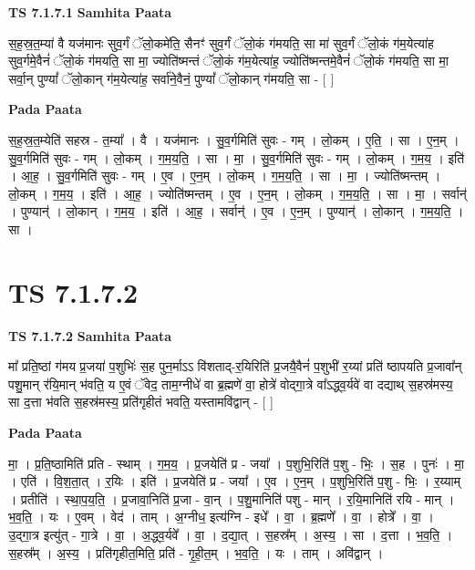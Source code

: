 \documentclass[17pt]{extarticle}
\begin{document}
\textbf{TS 7.1.7.1 } \newline
\textbf{Samhita Paata} \newline

स॒ह॒स्र॒त॒म्या॑ वै यज॑मानः सुव॒र्गं ॅलो॒कमे॑ति॒ सैनꣳ॑ सुव॒र्गं ॅलो॒कं ग॑मयति॒ सा मा॑ सुव॒र्गं ॅलो॒कं ग॑म॒येत्या॑ह सुव॒र्गमे॒वैनं॑ ॅलो॒कं ग॑मयति॒ सा मा॒ ज्योति॑ष्मन्तं ॅलो॒कं ग॑म॒येत्या॑ह॒ ज्योति॑ष्मन्तमे॒वैनं॑ ॅलो॒कं ग॑मयति॒ सा मा॒ सर्वा॒न् पुण्यां᳚ ॅलो॒कान् ग॑म॒येत्या॑ह॒ सर्वा॑ने॒वैनं॒ पुण्यां᳚ ॅलो॒कान् ग॑मयति॒ सा - [  ] \newline

\textbf{Pada Paata} \newline

स॒ह॒स्र॒त॒म्येति॑ सहस्र - त॒म्या᳚ । वै । यज॑मानः । सु॒व॒र्गमिति॑ सुवः - गम् । लो॒कम् । ए॒ति॒ । सा । ए॒न॒म् । सु॒व॒र्गमिति॑ सुवः - गम् । लो॒कम् । ग॒म॒य॒ति॒ । सा । मा॒ । सु॒व॒र्गमिति॑ सुवः - गम् । लो॒कम् । ग॒म॒य॒ । इति॑ । आ॒ह॒ । सु॒व॒र्गमिति॑ सुवः - गम् । ए॒व । ए॒न॒म् । लो॒कम् । ग॒म॒य॒ति॒ । सा । मा॒ । ज्योति॑ष्मन्तम् । लो॒कम् । ग॒म॒य॒ । इति॑ । आ॒ह॒ । ज्योति॑ष्मन्तम् । ए॒व । ए॒न॒म् । लो॒कम् । ग॒म॒य॒ति॒ । सा । मा॒ । सर्वान्॑ । पुण्यान्॑ । लो॒कान् । ग॒म॒य॒ । इति॑ । आ॒ह॒ । सर्वान्॑ । ए॒व । ए॒न॒म् । पुण्यान्॑ । लो॒कान् । ग॒म॒य॒ति॒ । सा ।  \newline




\section*{ TS 7.1.7.2 }

\textbf{TS 7.1.7.2 } \newline
\textbf{Samhita Paata} \newline

मा᳚ प्रति॒ष्ठां ग॑मय प्र॒जया॑ प॒शुभिः॑ स॒ह पुन॒र्माऽऽ वि॑शताद्-र॒यिरिति॑ प्र॒जयै॒वैनं॑ प॒शुभी॑ र॒य्यां प्रति॑ ष्ठापयति प्र॒जावा᳚न् पशु॒मान् र॑यि॒मान् भ॑वति॒ य ए॒वं ॅवेद॒ ताम॒ग्नीधे॑ वा ब्र॒ह्मणे॑ वा॒ होत्रे॑ वोद्गा॒त्रे वा᳚ऽद्ध्व॒र्यवे॑ वा दद्याथ् स॒हस्र॑मस्य॒ सा द॒त्ता भ॑वति स॒हस्र॑मस्य॒ प्रति॑गृहीतं भवति॒ यस्तामवि॑द्वान् - [  ] \newline

\textbf{Pada Paata} \newline

मा॒ । प्र॒ति॒ष्ठामिति॑ प्रति - स्थाम् । ग॒म॒य॒ । प्र॒जयेति॑ प्र - जया᳚ । प॒शुभि॒रिति॑ प॒शु - भिः॒ । स॒ह । पुनः॑ । मा॒ । एति॑ । वि॒श॒ता॒त् । र॒यिः । इति॑ । प्र॒जयेति॑ प्र - जया᳚ । ए॒व । ए॒न॒म् । प॒शुभि॒रिति॑ प॒शु - भिः॒ । र॒य्याम् । प्रतीति॑ । स्था॒प॒य॒ति॒ । प्र॒जावा॒निति॑ प्र॒जा - वा॒न् । प॒शु॒मानिति॑ पशु - मान् । र॒यि॒मानिति॑ रयि - मान् । भ॒व॒ति॒ । यः । ए॒वम् । वेद॑ । ताम् । अ॒ग्नीध॒ इत्य॑ग्नि - इधे᳚ । वा॒ । ब्र॒ह्मणे᳚ । वा॒ । होत्रे᳚ । वा॒ । उ॒द्गा॒त्र इत्यु॑त् - गा॒त्रे । वा॒ । अ॒द्ध्व॒र्यवे᳚ । वा॒ । द॒द्या॒त् । स॒हस्र᳚म् । अ॒स्य॒ । सा । द॒त्ता । भ॒व॒ति॒ । स॒हस्र᳚म् । अ॒स्य॒ । प्रति॑गृहीत॒मिति॒ प्रति॑ - गृ॒ही॒त॒म् । भ॒व॒ति॒ । यः । ताम् । अवि॑द्वान् ।  \newline
\end{document}
